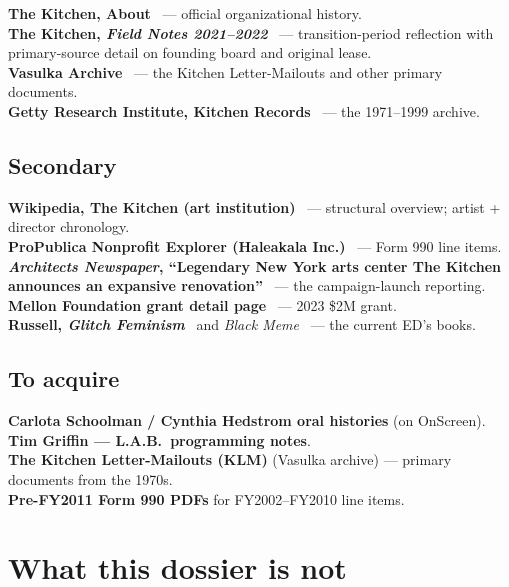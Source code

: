 \documentclass[10pt,letterpaper,twocolumn]{article}
\begin{document}
\textbf{The Kitchen, About}~\citep{thekitchen_about} --- official organizational history.\\
\textbf{The Kitchen, \emph{Field Notes 2021--2022}}~\citep{thekitchen_fieldnotes} --- transition-period reflection with primary-source detail on founding board and original lease.\\
\textbf{Vasulka Archive}~\citep{vasulka_archive} --- the Kitchen Letter-Mailouts and other primary documents.\\
\textbf{Getty Research Institute, Kitchen Records}~\citep{getty_kitchen_archive} --- the 1971--1999 archive.

\subsection{Secondary}

\textbf{Wikipedia, The Kitchen (art institution)}~\citep{wikipedia_kitchen} --- structural overview; artist + director chronology.\\
\textbf{ProPublica Nonprofit Explorer (Haleakala Inc.)}~\citep{propublica_kitchen} --- Form 990 line items.\\
\textbf{\emph{Architects Newspaper}, ``Legendary New York arts center The Kitchen announces an expansive renovation''}~\citep{archpaper2021} --- the campaign-launch reporting.\\
\textbf{Mellon Foundation grant detail page}~\citep{mellon_kitchen2023} --- 2023 \$2M grant.\\
\textbf{Russell, \emph{Glitch Feminism}}~\citep{russell2020glitch} and \emph{Black Meme}~\citep{russell2024blackmeme} --- the current ED's books.

\subsection{To acquire}

\textbf{Carlota Schoolman / Cynthia Hedstrom oral histories} (on OnScreen).\\
\textbf{Tim Griffin --- L.A.B.~programming notes}.\\
\textbf{The Kitchen Letter-Mailouts (KLM)} (Vasulka archive) --- primary documents from the 1970s.\\
\textbf{Pre-FY2011 Form 990 PDFs} for FY2002--FY2010 line items.

\section{What this dossier is not}
\end{document}
